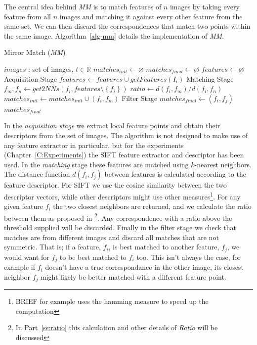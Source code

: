 The central idea behind \emph{MM} is to match features of $n$ images by 
taking every feature from all $n$ images and matching it against every 
other feature from the same set. We can then discard the correspondences 
that match two points within the same image. Algorithm~\ref{alg-mm} 
details the implementation of \emph{MM}.

\begin{algorithm}[htb]
\caption{Mirror Match (\emph{MM})}
\label{alg-mm}
\begin{algorithmic}
\Require $images$ : set of images, $t \in \mathbb{R}$
\State $matches_{init}\gets \varnothing$
\State $matches_{final}\gets \varnothing$
\State $features\gets \varnothing$
 \Comment Acquisition Stage
	\State $features\gets features \cup getFeatures(I_i)$
\EndFor
{} \Comment Matching Stage
	\State $f_m,f_n \gets get2NNs(f_i, features \setminus 
	\left\{f_i\right\})$
    \State $ratio \gets d(f_i, f_m) / d(f_i, f_n)$
		\State $matches_{init} \gets matches_{init} \cup \left(f_i, f_m\right)$
	\EndIf
\EndFor
{} \Comment Filter 
Stage
		\State $matches_{final} \gets (f_i, f_j)$
	\EndIf
\EndFor \\
\Return $matches_{final}$
\end{algorithmic}
\end{algorithm}

In the \emph{acquisition stage} we extract local feature points and 
obtain their descriptors from the set of images. The algorithm is not 
designed to make use of any feature extractor in particular, but for the
experiments (Chapter~\ref{C:Experiments}) the SIFT feature extractor and
descriptor has been used. In the \emph{matching} stage these features 
are matched using $k$-nearest neighbors.  The distance function $d(f_i, 
f_j)$ between features is calculated according to the feature 
descriptor. For SIFT we use the cosine similarity between the two 
descriptor vectors, while other descriptors might use other 
measures\footnote{BRIEF for example uses the hamming measure to speed up 
the computation}.  For any given feature $f_i$ the two closest neighbors 
are returned, and we calculate the ratio between them as proposed in 
\cite{lowe2004sift}\footnote{In Part~\ref{ss:ratio} this calculation and 
other details of \emph{Ratio} will be discussed}.  Any correspondence 
with a ratio above the threshold supplied will be discarded. Finally in 
the filter stage we check that matches are from different images and 
discard all matches that are not symmetric. That is; if a feature, 
$f_i$, is best matched to another feature, $f_j$, we would want for 
$f_j$ to be best matched to $f_i$ too.
This isn't always the case, for example if $f_i$ doesn't have a true 
correspondance in the other image, its closest neighbor $f_j$ might 
likely be better matched with a different feature point.

